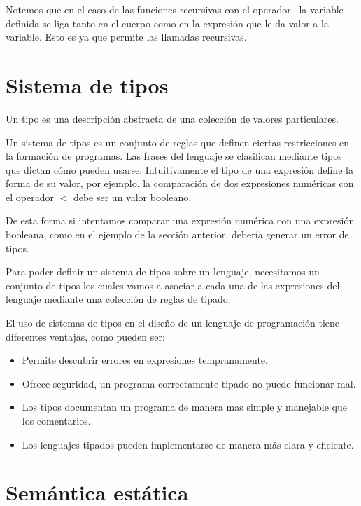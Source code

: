 \documentclass[12pt]{extarticle}
\begin{document}
\begin{remark} Notemos que en el caso de las funciones recursivas con el operador \recfun$\,$ la variable definida se liga tanto en el cuerpo como en la expresión que le da valor a la variable. Esto es ya que permite las llamadas recursivas.
\end{remark}

\section{Sistema de tipos}

\begin{definition}[Tipo]
    Un tipo es una descripción abstracta de una colección de valores particulares.
\end{definition}

Un sistema de tipos es un conjunto de reglas que definen ciertas restricciones en la formación de programas. Las frases del lenguaje se clasifican mediante tipos que dictan cómo pueden usarse. Intuitivamente el tipo de una expresión define la forma de su valor, por ejemplo, la comparación de dos expresiones numéricas con el operador $<$ debe ser un valor booleano. 

De esta forma si intentamos comparar una expresión numérica con una expresión booleana, como en el ejemplo de la sección anterior, debería generar un error de tipos.

Para poder definir un sistema de tipos sobre un lenguaje, necesitamos un conjunto de tipos los cuales vamos a asociar a cada una de las expresiones del lenguaje mediante una colección de reglas de tipado.

El uso de sistemas de tipos en el diseño de un lenguaje de programación tiene diferentes ventajas, como pueden ser:

\begin{itemize}
    \item Permite descubrir errores en expresiones tempranamente.
    \item Ofrece seguridad, un programa correctamente tipado no puede funcionar mal.
    \item Los tipos documentan un programa de manera mas simple y manejable que los comentarios.
    \item Los lenguajes tipados pueden implementarse de manera más clara y eficiente.
\end{itemize}

\section{Semántica estática}
\end{document}

